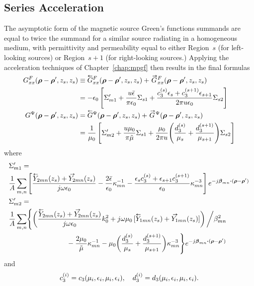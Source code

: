 \subsection{Series Acceleration}
The asymptotic form of the magnetic source Green's functions  summands
are equal to twice the summand for a similar source radiating in a
homogeneous medium, with permittivity and permeability equal to either
Region~$s$ (for left-looking sources) or Region~$s+1$ (for
right-looking sources.)  Applying the acceleration techniques of
Chapter~\ref{chap:mpgf} then results in the final formulas
\begin{subequations}
  \begin{align}
    \GFxx(\vecrho-\vecrho',z_s,z_s)  &\equiv
    \GlFxx(\vecrho-\vecrho',z_s,z_s) +  \GrFxx(\vecrho-\vecrho',z_s,z_s) 
    \nonumber \\
    &=
    -\epsilon_0 
    \left[
      \Sigma'_{m1} + \frac{u\bar{\epsilon}}{\pi\epsilon_0} \Sigma_{s1}
      + \frac{c_3\ess \epsilon_s + c_3\spw\epsilon_{s+1}}%
      {2\pi u\epsilon_0} \Sigma_{s2} 
    \right]  \\
    \GPsi(\vecrho-\vecrho',z_s,z_s) &= 
    \GlPsi(\vecrho-\vecrho',z_s,z_s) +  \GrPsi(\vecrho-\vecrho',z_s,z_s)  
    \nonumber \\
    &= \frac{1}{\mu_0}
    \left[
      \Sigma'_{m2} + \frac{u\mu_0}{\pi\tilde{\mu}} \Sigma_{s1}
      + \frac{\mu_0}{2\pi u} 
      \Biggl(
      \frac{d_3\ess}{\mu_s}+\frac{d_3\spw}{\mu_{s+1}}
      \Biggr)
      \Sigma_{s2}
    \right]
  \end{align}
\end{subequations}
where
\begin{subequations}
  \begin{align}
    & \Sigma'_{m1} = \nonumber \\
    & \frac{1}{A} \summn
    \left[
      \frac{\Yleft_{2mn}(z_s) + \Yright_{2mn}(z_s)}{j\omega\epsilon_0} 
      - \frac{2\bar{\epsilon}}{\epsilon_0} \kappa_{mn}^{-1}
      - \frac{\epsilon_s c_3\ess + \epsilon_{s+1}c_3\spw}{\epsilon_0} 
      \kappa_{mn}^{-3}
    \right]
    e^{-j\vecbeta_{mn} \bdot (\vecrho-\vecrho')}  \\ 
    & \Sigma'_{m2} = \nonumber \\
    & \frac{1}{A} \summn
    \Biggl\{
    \left(
      \frac{\textstyle\Yleft_{2mn}(z_s) + \Yright_{2mn}(z_s)}
      {j\omega\epsilon_0} k_0^2
      + j\omega\mu_0\left[\Yleft_{1mn}(z_s) + \Yright_{1mn}(z_s)\right] 
    \right) 
    \bigg/ {\beta_{mn}^2} \nonumber \\
    & \mkern 150mu \mbox{} - \frac{2\mu_0}{\tilde{\mu}} \kappa_{mn}^{-1}
    - \mu_0\biggl(\frac{d_3\ess}{\mu_s}+\frac{d_3\spw}{\mu_{s+1}}\biggr)
    \kappa_{mn}^{-3}
    \Biggr\}
    e^{-j\vecbeta_{mn} \bdot (\vecrho-\vecrho')}
  \end{align}
  \label{eq:finalmodalmagnetic}
\end{subequations}
and
\begin{equation}
    c_3^{(i)} = c_3(\mu_i,\epsilon_i,\mu_i,\epsilon_i), \quad
    d_3^{(i)} = d_3(\mu_i,\epsilon_i,\mu_i,\epsilon_i).
\end{equation}

